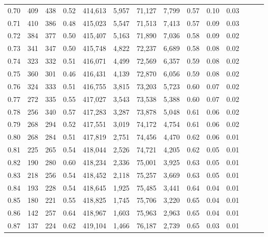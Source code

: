 \begin{tabular}{rrrrrrrrrrrrrr}
0.70 &     409 &    438 &  0.52 &  414,613 &    5,957 &  71,127 &   7,799 &  0.57 &  0.10 &      0.03 \\
0.71 &     410 &    386 &  0.48 &  415,023 &    5,547 &  71,513 &   7,413 &  0.57 &  0.09 &      0.03 \\
0.72 &     384 &    377 &  0.50 &  415,407 &    5,163 &  71,890 &   7,036 &  0.58 &  0.09 &      0.02 \\
0.73 &     341 &    347 &  0.50 &  415,748 &    4,822 &  72,237 &   6,689 &  0.58 &  0.08 &      0.02 \\
0.74 &     323 &    332 &  0.51 &  416,071 &    4,499 &  72,569 &   6,357 &  0.59 &  0.08 &      0.02 \\
0.75 &     360 &    301 &  0.46 &  416,431 &    4,139 &  72,870 &   6,056 &  0.59 &  0.08 &      0.02 \\
0.76 &     324 &    333 &  0.51 &  416,755 &    3,815 &  73,203 &   5,723 &  0.60 &  0.07 &      0.02 \\
0.77 &     272 &    335 &  0.55 &  417,027 &    3,543 &  73,538 &   5,388 &  0.60 &  0.07 &      0.02 \\
0.78 &     256 &    340 &  0.57 &  417,283 &    3,287 &  73,878 &   5,048 &  0.61 &  0.06 &      0.02 \\
0.79 &     268 &    294 &  0.52 &  417,551 &    3,019 &  74,172 &   4,754 &  0.61 &  0.06 &      0.02 \\
0.80 &     268 &    284 &  0.51 &  417,819 &    2,751 &  74,456 &   4,470 &  0.62 &  0.06 &      0.01 \\
0.81 &     225 &    265 &  0.54 &  418,044 &    2,526 &  74,721 &   4,205 &  0.62 &  0.05 &      0.01 \\
0.82 &     190 &    280 &  0.60 &  418,234 &    2,336 &  75,001 &   3,925 &  0.63 &  0.05 &      0.01 \\
0.83 &     218 &    256 &  0.54 &  418,452 &    2,118 &  75,257 &   3,669 &  0.63 &  0.05 &      0.01 \\
0.84 &     193 &    228 &  0.54 &  418,645 &    1,925 &  75,485 &   3,441 &  0.64 &  0.04 &      0.01 \\
0.85 &     180 &    221 &  0.55 &  418,825 &    1,745 &  75,706 &   3,220 &  0.65 &  0.04 &      0.01 \\
0.86 &     142 &    257 &  0.64 &  418,967 &    1,603 &  75,963 &   2,963 &  0.65 &  0.04 &      0.01 \\
0.87 &     137 &    224 &  0.62 &  419,104 &    1,466 &  76,187 &   2,739 &  0.65 &  0.03 &      0.01 \\

\end{tabular}
